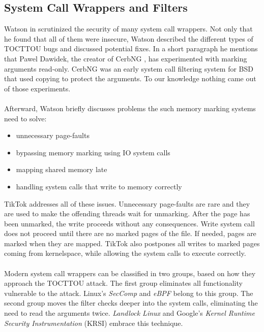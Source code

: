\subsection{System Call Wrappers and Filters}

Watson in \cite{watson2007exploiting} scrutinized the security of many system
call wrappers. Not only that he found that all of them were insecure, Watson
described the different types of TOCTTOU bugs and discussed potential fixes.
In a short paragraph he mentions that Pawel Dawidek, the creator of CerbNG 
\cite{zak_frasunek_dawidek}, has experimented with marking arguments read-only.
CerbNG was an early system call filtering system for BSD that used copying to 
protect the arguments. To our knowledge nothing came out of those experiments. 
\\
\\
Afterward, Watson briefly discusses problems the such memory marking systems
need to solve: 
\begin{itemize}
    \item unnecessary page-faults
    \item bypassing memory marking using IO system calls
    \item mapping shared memory late
    \item handling system calls that write to memory correctly
\end{itemize}

TikTok addresses all of these issues. Unnecessary page-faults are rare and they
are used to make the offending threads wait for unmarking. After the page has
been unmarked, the write proceeds without any consequences. Write system call
does not proceed until there are no marked pages of the file. If needed, pages
are marked when they are mapped. TikTok also postpones all writes to marked
pages coming from kernelspace, while allowing the system calls to execute
correctly.
\\
\\
Modern system call wrappers can be classified in two groups, based on how they
approach the TOCTTOU attack. The first group eliminates all functionality
vulnerable to the attack.
Linux's \emph{SecComp}\cite{seccomp} and \emph{eBPF}\cite{ebpf} belong to this
group. The second group moves the filter checks deeper into the system calls,
eliminating the need to read the arguments twice. \emph{Landlock Linux}
\cite{landlock} and Google's \emph{Kernel Runtime Security Instrumentation}
(KRSI)\cite{krsi} embrace this technique.

